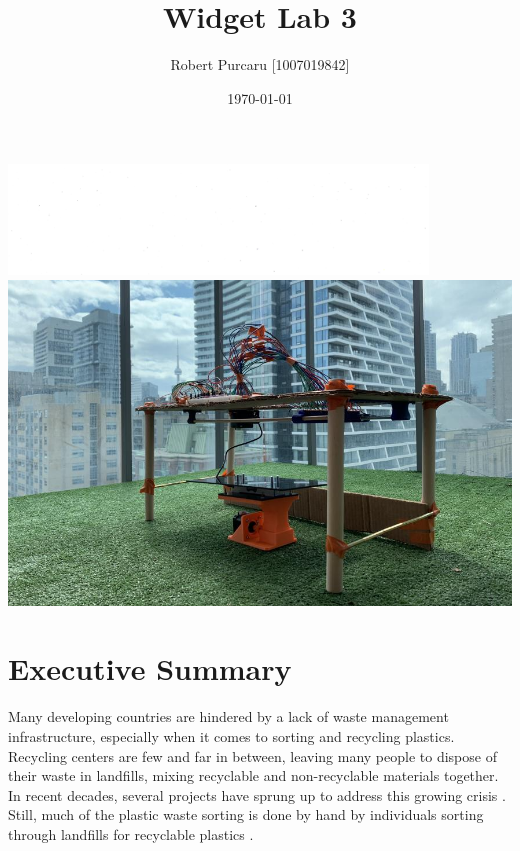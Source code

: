 \documentclass[12pt]{article}
\begin{document}
    \title{Widget Lab 3}
        \author{Robert Purcaru [1007019842]}
        \date{\today}
    \maketitle

    \includegraphics[width=\linewidth]{White.png}
    \includegraphics[width=\linewidth]{CN.png}


    \newpage

    \section*{Executive Summary}
        Many developing countries are hindered by a lack of waste management infrastructure, especially when it comes to sorting and recycling plastics. Recycling centers are few and far in between, leaving many people to dispose of their waste in landfills, mixing recyclable and non-recyclable materials together. In recent decades, several projects have sprung up to address this growing crisis \cite{wansi_2022} \cite{dow_2022}. Still, much of the plastic waste sorting is done by hand by individuals sorting through landfills for recyclable plastics \cite{GhanaSorting}.
\end{document}
